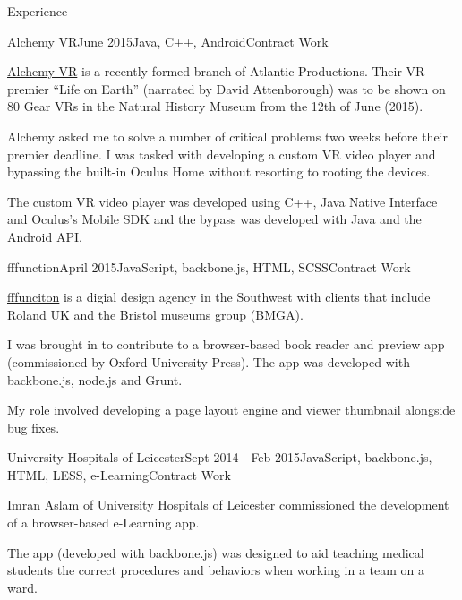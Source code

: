 \documentclass{resume} %
\begin{document}
\begin{rSection}{Experience}

\begin{rSubsection}{Alchemy VR}{June 2015}{Java, C++, Android}{Contract Work}
\item \href{http://www.alchemyvr.com/}{Alchemy VR} is a recently formed branch of Atlantic Productions. Their VR premier ``Life on Earth'' (narrated by David Attenborough) was to be shown on 80 Gear VRs in the Natural History Museum from the 12th of June (2015).
\item Alchemy asked me to solve a number of critical problems two weeks before their premier deadline. I was tasked with developing a custom VR video player and bypassing the built-in Oculus Home without resorting to rooting the devices.
\item The custom VR video player was developed using C++, Java Native Interface and Oculus's Mobile SDK and the bypass was developed with Java and the Android API.
\end{rSubsection}


\begin{rSubsection}{fffunction}{April 2015}{JavaScript, backbone.js, HTML, SCSS}{Contract Work}
\item \href{http://fffunction.co/}{fffunciton} is a digial design agency in the Southwest with clients that include \href{http://www.roland.co.uk}{Roland UK} and the Bristol museums group (\href{http://bristolmuseums.org.uk}{BMGA}).
\item I was brought in to contribute to a browser-based book reader and preview app (commissioned by Oxford University Press). The app was developed with backbone.js, node.js and Grunt. 
\item My role involved developing a page layout engine and viewer thumbnail alongside bug fixes.
\end{rSubsection}


\begin{rSubsection}{University Hospitals of Leicester}{Sept 2014 - Feb 2015}{JavaScript, backbone.js, HTML, LESS, e-Learning}{Contract Work}
\item Imran Aslam of University Hospitals of Leicester commissioned the development of a browser-based e-Learning app.
\item The app (developed with backbone.js) was designed to aid teaching medical students the correct procedures and behaviors when working in a team on a ward.
\end{rSubsection}


\end{rSection}
\end{document}
